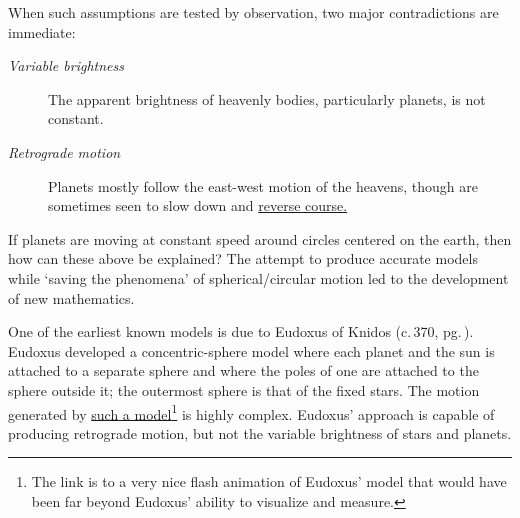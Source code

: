 When such assumptions are tested by observation, two major contradictions are immediate:
\begin{description}
  \item[\normalfont\emph{Variable brightness}] The apparent brightness of heavenly bodies, particularly planets, is not constant.
  \item[\normalfont\emph{Retrograde motion}] Planets mostly follow the east-west motion of the heavens, though are sometimes seen to slow down and \href{http://math.uci.edu/~ndonalds/math184/retrograde.html}{reverse course.}
\end{description}

If planets are moving at constant speed around circles centered on the earth, then how can these above be explained? The attempt to produce accurate models while `saving the phenomena' of spherical/circular motion led to the development of new mathematics.\smallbreak

One of the earliest known models is due to Eudoxus of Knidos (c.\,370\BC, pg.\,\pageref{pg:eudoxus}). Eudoxus developed a concentric-sphere model where each planet and the sun is attached to a separate sphere and where the poles of one are attached to the sphere outside it; the outermost sphere is that of the fixed stars.
The motion generated by \href{http://web.calstatela.edu/faculty/hmendel/Ancient Mathematics/Eudoxus/Astronomy/EudoxusHomocentricSpheres.htm}{such a model}\footnote{The link is to a very nice flash animation of Eudoxus' model that would have been far beyond Eudoxus' ability to visualize and measure.} is highly complex. Eudoxus' approach is capable of producing retrograde motion, but not the variable brightness of stars and planets.
\goodbreak



